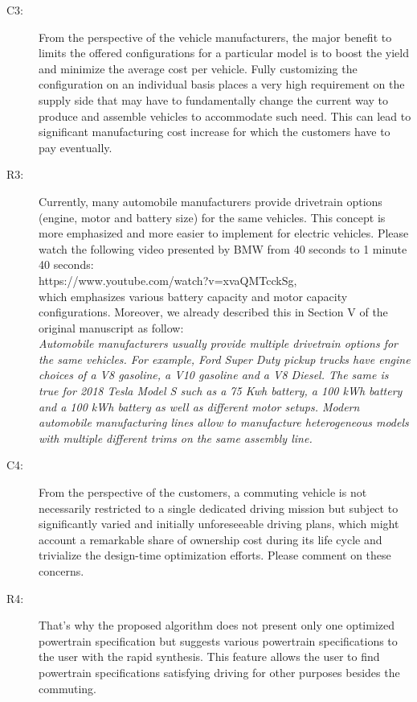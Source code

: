 \documentclass[onecolumn]{IEEEconf}
\begin{document}
\begin{description}
\item [C3: ] From the perspective of the vehicle manufacturers, the major benefit to limits the offered configurations for a particular model is to boost the yield and minimize the average cost per vehicle. Fully customizing the configuration on an individual basis places a very high requirement on the supply side that may have to fundamentally change the current way to produce and assemble vehicles to accommodate such need. This can lead to significant manufacturing cost increase for which the customers have to pay eventually. 
\item [R3: ] Currently, many automobile manufacturers provide drivetrain options (engine, motor and battery size) for the same vehicles. This concept is more emphasized and more easier to implement for electric vehicles. Please watch the following video presented by BMW from 40 seconds to 1 minute 40 seconds: \\
https://www.youtube.com/watch?v=xvaQMTcckSg, \\
which emphasizes various battery capacity and motor capacity configurations. Moreover, we already described this in Section V of the original manuscript as follow:\\

\textit{Automobile manufacturers usually provide multiple drivetrain options for the same vehicles. For example, Ford Super Duty pickup trucks have engine choices of a V8 gasoline, a V10 gasoline and a V8 Diesel. The same is true for 2018 Tesla Model S such as a 75 Kwh battery, a 100 kWh battery and a 100 kWh battery as well as different motor setups. Modern automobile manufacturing lines allow to manufacture heterogeneous models with multiple different trims on the same assembly line.}
~\\

\item [C4:] From the perspective of the customers, a commuting vehicle is not necessarily restricted to a single dedicated driving mission but subject to significantly varied and initially unforeseeable driving plans, which might account a remarkable share of ownership cost during its life cycle and trivialize the design-time optimization efforts. Please comment on these concerns.
\item [R4: ] That's why the proposed algorithm does not present only one optimized powertrain specification but suggests various powertrain specifications to the user with the rapid synthesis. This feature allows the user to find powertrain specifications satisfying driving for other purposes besides the commuting.\\


\end{description}
\end{document}
